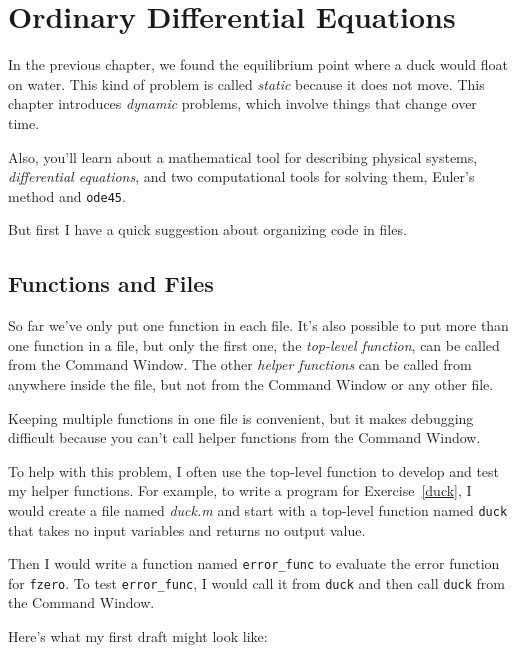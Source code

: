 \chapter{Ordinary Differential Equations}


In the previous chapter, we found the equilibrium point where a duck would float on water.  This kind of problem is called \emph{static} because it does not move.  This chapter introduces \emph{dynamic} problems, which involve things that change over time.

Also, you'll learn about a mathematical tool for describing physical systems, \emph{differential equations}, and two computational tools for solving them, Euler's method and \lstinline{ode45}.

But first I have a quick suggestion about organizing code in files.

\section{Functions and Files}
\label{funfiles}

So far we've only put one function in each file.  It's also possible
to put more than one function in a file, but only the first one, the
\emph{top-level function}, can be called from the Command
Window.  The other \emph{helper functions} can be called from anywhere inside the file, but not from the Command Window or any other file.


Keeping multiple functions in one file is convenient, but it makes  debugging
difficult because you can't call helper functions from the Command
Window.

To help with this problem, I often use the top-level function
to develop and test my helper functions.  For example, to write
a program for Exercise~\ref{duck}, I would create a file named
\emph{duck.m} and start with a top-level function named \lstinline{duck}
that takes no input variables and returns no output value.

Then I would write a function named \lstinline{error_func} to
evaluate the error function for \lstinline{fzero}.  To test
\lstinline{error_func}, I would call it from \lstinline{duck} and then
call \lstinline{duck} from the Command Window.


Here's what my first draft might look like:

